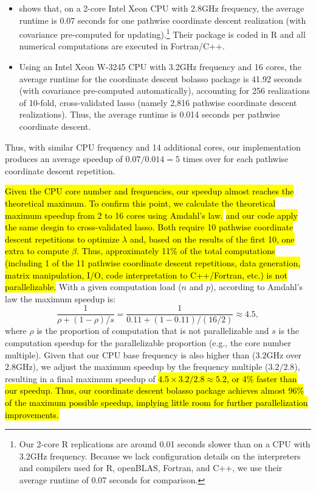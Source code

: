 \documentclass[11pt,review,authoryear]{elsarticle}
\begin{document}
\begin{itemize}
  \item  \citet[Table 1]{friedman2010regularization} shows that, on a 2-core Intel Xeon CPU with 2.8GHz frequency, the average runtime is 0.07 seconds for one pathwise coordinate descent realization (with covariance pre-computed for updating).\footnote{Our 2-core R replications are around 0.01 seconds slower than \citet{friedman2010regularization} on a CPU with 3.2GHz frequency. Because we lack configuration details on the interpreters and compilers \citet{friedman2010regularization} used for R, openBLAS, Fortran, and C++, we use their average runtime of 0.07 seconds for comparison.} Their package is coded in R and all numerical computations are executed in Fortran/C++.
  \item  Using an Intel Xeon W-3245 CPU with 3.2GHz frequency and 16 cores, the average runtime for the coordinate descent bolasso package is 41.92 seconds (with covariance pre-computed automatically), accounting for 256 realizations of 10-fold, cross-validated lasso (namely 2,816 pathwise coordinate descent realizations). Thus, the average runtime is 0.014 seconds per pathwise coordinate descent.
\end{itemize}

\noindent
Thus, with similar CPU frequency and 14 additional cores, our implementation produces an average speedup of $0.07/0.014=5$ times over \citet{friedman2010regularization} for each pathwise coordinate descent repetition. 

\hl{Given the CPU core number and frequencies, our speedup almost reaches the theoretical maximum. To confirm this point, we calculate the theoretical maximum speedup from 2 to 16 cores using Amdahl's law.} \citet{friedman2010regularization} \hl{and our code apply the same desgin to cross-validated lasso. Both require 10 pathwise coordinate descent repetitions to optimize $\lambda$ and, based on the results of the first 10, one extra to compute $\beta$. Thus, approximately 11\% of the total computations (including 1 of the 11 pathwise coordinate descent repetitions, data generation, matrix manipulation, I/O, code interpretation to C++/Fortran, etc.) is not parallelizable.} With a given computation load ($n$ and $p$), according to Amdahl's law the maximum speedup is:
%
\begin{equation}
  \frac{1}{\rho + (1-\rho)/s} = \frac{1}{0.11 + (1-0.11)/(16/2)} \approx 4.5,
\end{equation}
%
where $\rho$ is the proportion of computation that is not parallelizable and $s$ is the computation speedup for the parallelizable proportion (e.g., the core number multiple). Given that our CPU base frequency is also higher than \citet[Table 1]{friedman2010regularization} ($3.2$GHz over $2.8$GHz), we adjust the maximum speedup by the frequency multiple ($3.2/2.8$), resulting in a final maximum speedup of \hl{$4.5 \times 3.2/2.8 \approx 5.2$, or 4\% faster than our speedup. Thus, our coordinate descent bolasso package achieves almost 96\% of the maximum possible speedup, implying little room for further parallelization improvements.}
\end{document}
